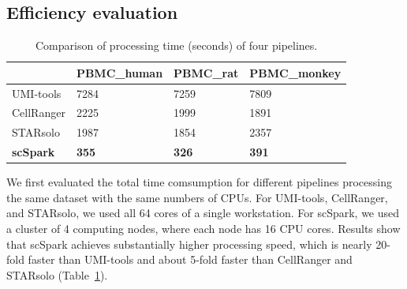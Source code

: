 \documentclass[conference]{IEEEtran}
\begin{document}
\subsection{Efficiency evaluation}

\begin{table}
	\centering
	\caption{Comparison of processing time (seconds) of four pipelines.}\label{tab1}
	\begin{tabular}{l | l | l | l }
		\hline
		 & PBMC\_human & PBMC\_rat & PBMC\_monkey \\ 
		\hline
		UMI-tools & 7284 & 7259 & 7809 \\
		CellRanger & 2225 & 1999 & 1891 \\
		STARsolo & 1987 & 1854 & 2357 \\
		\textbf{scSpark} & \textbf{355} & \textbf{326} & \textbf{391} \\
		\hline
	\end{tabular}
\end{table}

We first evaluated the total time comsumption for different pipelines processing the same dataset with the same numbers of CPUs. 
For UMI-tools, CellRanger, and STARsolo, we used all 64 cores of a single workstation. 
For scSpark, we used a cluster of 4 computing nodes, where each node has 16 CPU cores. 
Results show that scSpark achieves substantially higher processing speed, which is nearly 20-fold faster than UMI-tools and about 5-fold faster than CellRanger and STARsolo (Table~\ref{tab1}). 
\end{document}
